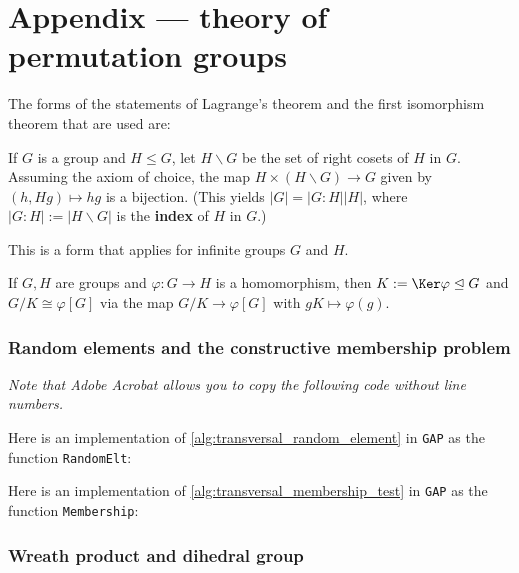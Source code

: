 \chapter{Appendix --- theory of permutation groups}%

The forms of the statements of Lagrange's theorem and the first isomorphism theorem that are used are:

\begin{theorem}[Lagrange]\label{thm:lagrange}
    If $G$ is a group and $H \leq G$, let $H\backslash G$ be the set of right cosets of $H$ in $G$. Assuming the axiom of choice, the map $H \times (H\backslash G) \to G$ given by $(h,Hg) \mapsto hg$ is a bijection. (This yields $|G| = |G:H| |H|$, where $|G : H| := |H\backslash G|$ is the \textbf{index} of $H$ in $G$.) \qedhere
\end{theorem}

This is a form that applies for infinite groups $G$ and $H$.

\begin{theorem}\label{thm:FIT}
    If $G,H$ are groups and $\varphi : G \to H$ is a homomorphism, then $K := \Ker\varphi \trianglelefteq G$ and $G/K \cong \varphi[G]$ via the map $G/K \to \varphi[G]$ with $gK \mapsto \varphi(g)$. \qedhere
\end{theorem}

\subsection{Random elements and the constructive membership problem}

\textit{Note that Adobe Acrobat allows you to copy the following code without line numbers.}

Here is an implementation of \autoref{alg:transversal_random_element} in \texttt{GAP} as the function \texttt{RandomElt}:\label{app:transversal_random_element}



Here is an implementation of \autoref{alg:transversal_membership_test} in \texttt{GAP} as the function \texttt{Membership}:\label{app:transversal_membership_test}



\subsection{Wreath product and dihedral group}


